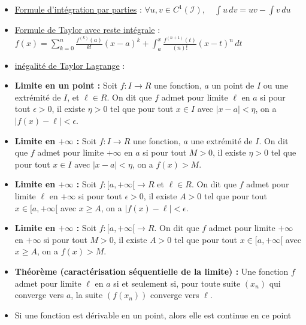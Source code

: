 \documentclass{article}
\begin{document}
\begin{itemize}[label=$\ast$]
	\item \underline{Formule d'intégration par parties} : \( \forall u, v \in C^1(\mathcal{I}), \quad \int u \, dv = uv - \int v \, du \)
	\item \underline{Formule de Taylor avec reste intégrale} : \( f(x) = \sum_{k=0}^{n} \frac{f^{(k)}(a)}{k!}(x-a)^k + \int_{a}^{x} \frac{f^{(n+1)}(t)}{(n)!}(x-t)^{n} \, dt \)
	\item \underline{inégalité de Taylor Lagrange} : 
	\item \textbf{Limite en un point :} Soit \( f: I \rightarrow R \) une fonction, \( a \) un point de \( I \) ou une extrémité de \( I \), et \( \ell \in R \). On dit que \( f \) admet pour limite \( \ell \) en \( a \) si pour tout \( \epsilon > 0 \), il existe \( \eta > 0 \) tel que pour tout \( x \in I \) avec \( |x - a| < \eta \), on a \( |f(x) - \ell| < \epsilon \).

	\item \textbf{Limite en \( +\infty \) :} Soit \( f: I \rightarrow R \) une fonction, \( a \) une extrémité de \( I \). On dit que \( f \) admet pour limite \( +\infty \) en \( a \) si pour tout \( M > 0 \), il existe \( \eta > 0 \) tel que pour tout \( x \in I \) avec \( |x - a| < \eta \), on a \( f(x) > M \).

	\item \textbf{Limite en \( +\infty \) :} Soit \( f: [a, +\infty[ \rightarrow R \) et \( \ell \in R \). On dit que \( f \) admet pour limite \( \ell \) en \( +\infty \) si pour tout \( \epsilon > 0 \), il existe \( A > 0 \) tel que pour tout \( x \in [a, +\infty[ \) avec \( x \geq A \), on a \( |f(x) - \ell| < \epsilon \).

	\item \textbf{Limite en \( +\infty \) :} Soit \( f: [a, +\infty[ \rightarrow R \). On dit que \( f \) admet pour limite \( +\infty \) en \( +\infty \) si pour tout \( M > 0 \), il existe \( A > 0 \) tel que pour tout \( x \in [a, +\infty[ \) avec \( x \geq A \), on a \( f(x) > M \).

	\item \textbf{Théorème (caractérisation séquentielle de la limite) :} 
Une fonction \( f \) admet pour limite \( \ell \) en \( a \) si et seulement si, pour toute suite \( (x_n) \) qui converge vers \( a \), la suite \( (f(x_n)) \) converge vers \( \ell \).

	\item Si une fonction est dérivable en un point, alors elle est continue en ce point


\end{itemize}
\end{document}
